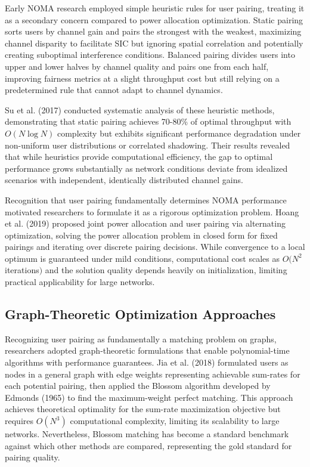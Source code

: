 Early NOMA research employed simple heuristic rules for user pairing, treating it as a secondary concern compared to power allocation optimization. Static pairing sorts users by channel gain and pairs the strongest with the weakest, maximizing channel disparity to facilitate SIC but ignoring spatial correlation and potentially creating suboptimal interference conditions. Balanced pairing divides users into upper and lower halves by channel quality and pairs one from each half, improving fairness metrics at a slight throughput cost but still relying on a predetermined rule that cannot adapt to channel dynamics.

Su et al. (2017) conducted systematic analysis of these heuristic methods, demonstrating that static pairing achieves 70-80\% of optimal throughput with $O(N \log N)$ complexity but exhibits significant performance degradation under non-uniform user distributions or correlated shadowing. Their results revealed that while heuristics provide computational efficiency, the gap to optimal performance grows substantially as network conditions deviate from idealized scenarios with independent, identically distributed channel gains.

Recognition that user pairing fundamentally determines NOMA performance motivated researchers to formulate it as a rigorous optimization problem. Hoang et al. (2019) proposed joint power allocation and user pairing via alternating optimization, solving the power allocation problem in closed form for fixed pairings and iterating over discrete pairing decisions. While convergence to a local optimum is guaranteed under mild conditions, computational cost scales as $O(N^2$ iterations$)$ and the solution quality depends heavily on initialization, limiting practical applicability for large networks.

\subsection{Graph-Theoretic Optimization Approaches}

Recognizing user pairing as fundamentally a matching problem on graphs, researchers adopted graph-theoretic formulations that enable polynomial-time algorithms with performance guarantees. Jia et al. (2018) formulated users as nodes in a general graph with edge weights representing achievable sum-rates for each potential pairing, then applied the Blossom algorithm developed by Edmonds (1965) to find the maximum-weight perfect matching. This approach achieves theoretical optimality for the sum-rate maximization objective but requires $O(N^3)$ computational complexity, limiting its scalability to large networks. Nevertheless, Blossom matching has become a standard benchmark against which other methods are compared, representing the gold standard for pairing quality.

